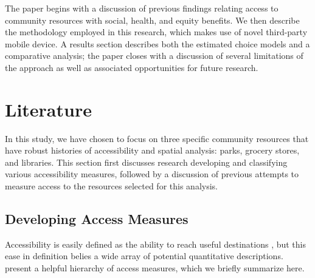 \documentclass[ijerph,article,submit,moreauthors,pdftex]{mdpi}
\begin{document}
The paper begins with a discussion of previous findings relating access to
community resources with social, health, and equity benefits. We then describe
the methodology employed in this research, which makes use of novel third-party
mobile device. A results section describes both the estimated choice models and
a comparative analysis; the paper closes with a discussion of several
limitations of the approach as well as associated opportunities for future research.

\hypertarget{lit-review}{%
\section{Literature}\label{lit-review}}

In this study, we have chosen to focus on three specific community resources
that have robust histories of accessibility and spatial analysis: parks, grocery
stores, and libraries. This section first discusses research developing and
classifying various accessibility measures, followed by a discussion of previous
attempts to measure access to the resources selected for this analysis.

\hypertarget{developing-access-measures}{%
\subsection{Developing Access Measures}\label{developing-access-measures}}

Accessibility is easily defined as the ability to reach useful destinations \citep{handy1997},
but this ease in definition belies a wide array of potential quantitative
descriptions. \citet{dong2006} present a helpful hierarchy of access measures, which we
briefly summarize here.
\end{document}
